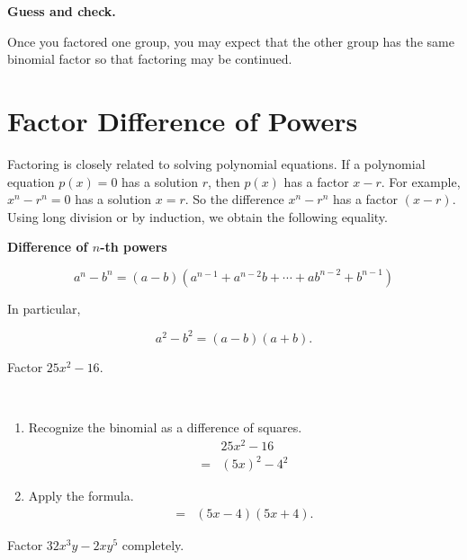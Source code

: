 \documentclass[
  en,11pt]{elegantbook}
\newcommand{\size}[2]{{\fontsize{#1}{0}\selectfont#2}}
\newenvironment{rmdtip}{
	\vspace*{0.5\baselineskip}
	\par\noindent
	\makebox[-3pt][r]{\color{red!90}\size{12}{\HandRight}\,\,}
    \begin{tcolorbox}[
    enhanced,
    title={\textbf{\color{second}Tips}},
    title style={left color=blue!10!green!20!white,right color=yellow!20!blue!20!white},
    colback=cyan!10!white,
    ]
    \sffamily
}{
    \end{tcolorbox}
    \par\ignorespacesafterend
}
\let\BeginKnitrBlock\begin \let\EndKnitrBlock\end
\begin{document}
\begin{rmdtip}

\textbf{Guess and check.}

Once you factored one group, you may expect that the other group has the same binomial factor so that factoring may be continued.

\end{rmdtip}

\hypertarget{factor-difference-of-powers}{%
\section{Factor Difference of Powers}\label{factor-difference-of-powers}}

Factoring is closely related to solving polynomial equations. If a polynomial equation \(p(x)=0\) has a solution \(r\), then \(p(x)\) has a factor \(x-r\). For example, \(x^n-r^n=0\) has a solution \(x=r\). So the difference \(x^n-r^n\) has a factor \((x-r)\). Using long division or by induction, we obtain the following equality.

\textbf{Difference of \(n\)-th powers}

\[a^n-b^n=(a-b)(a^{n-1}+a^{n-2}b+\cdots +ab^{n-2}+b^{n-1})\]

In particular,

\[a^2-b^2=(a-b)(a+b).\]

\BeginKnitrBlock{example}
\protect\hypertarget{exm:unnamed-chunk-15}{}{\label{exm:unnamed-chunk-15} }
Factor \(25x^2-16\).
\EndKnitrBlock{example}

\BeginKnitrBlock{solution}
{}\\

\begin{enumerate}
\def\labelenumi{\arabic{enumi}.}

\item
  Recognize the binomial as a difference of squares.
  \[\begin{aligned}
  &25x^2-16\\
  =&(5x)^2-4^2
  \end{aligned}
  \]
\item
  Apply the formula.
  \[
  \begin{aligned}
  =&(5x-4)(5x+4).
  \end{aligned}
  \]
\end{enumerate}
\EndKnitrBlock{solution}

\BeginKnitrBlock{example}
\protect\hypertarget{exm:unnamed-chunk-17}{}{\label{exm:unnamed-chunk-17} }
Factor \(32x^3y-2xy^5\) completely.
\EndKnitrBlock{example}
\end{document}
